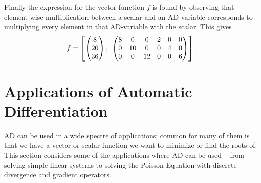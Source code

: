 Finally the expression for the vector function $f$ is found by observing that element-wise multiplication between a scalar and an AD-variable corresponds to multiplying every element in that AD-variable with the scalar. This gives
\begin{align*}
    f = \left[
        \begin{pmatrix}
        8\\20\\36
        \end{pmatrix}
        ,\hspace{0.5em}
        \begin{pmatrix}
        8&0&0&2&0&0\\
        0&10&0&0&4&0\\
        0&0&12&0&0&6
        \end{pmatrix}
        \right].
\end{align*}
\section{Applications of Automatic Differentiation}
\label{sec:ApplicationsAD}
AD can be used in a wide spectre of applications; common for many of them is that we have a vector or scalar function we want to minimize or find the roots of. This section considers some of the applications where AD can be used -- from solving simple linear systems to solving the Poisson Equation with discrete divergence and gradient operators.

